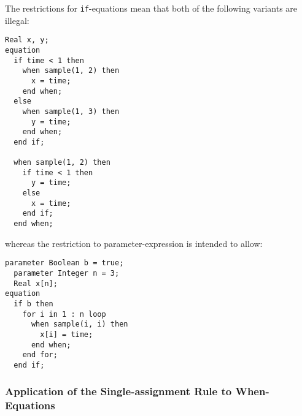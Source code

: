 \begin{example}
The restrictions for \lstinline!if!-equations mean that both of the following variants are illegal:
\begin{lstlisting}[language=modelica]
  Real x, y;
equation
  if time < 1 then
    when sample(1, 2) then
      x = time;
    end when;
  else
    when sample(1, 3) then
      y = time;
    end when;
  end if;

  when sample(1, 2) then
    if time < 1 then
      y = time;
    else
      x = time;
    end if;
  end when;
\end{lstlisting}
whereas the restriction to parameter-expression is intended to allow:
\begin{lstlisting}[language=modelica]
  parameter Boolean b = true;
  parameter Integer n = 3;
  Real x[n];
equation
  if b then
    for i in 1 : n loop
      when sample(i, i) then
        x[i] = time;
      end when;
    end for;
  end if;
\end{lstlisting}
\end{example}

\subsubsection{Application of the Single-assignment Rule to When-Equations}\label{application-of-the-single-assignment-rule-to-when-equations}

